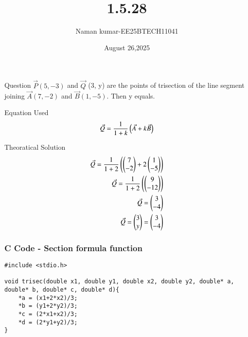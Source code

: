 \documentclass{beamer}
\begin{document}
\title 
{1.5.28}
\date{August 26,2025}

\author 
{Naman kumar-EE25BTECH11041}

\frame{\titlepage}
\begin{frame}{Question}
$\Vec{P} (5, -3)$ and $\Vec{Q}$ (3, y) are the points of trisection of the line segment joining $\Vec{A} (7, -2)$ and $\Vec{B} (1, -5)$. Then y equals.
\end{frame}

\begin{frame}{Equation Used}
\begin{align}
\Vec{Q}=\frac{1}{1+k}\left(\Vec{A}+k\Vec{B}\right)
\end{align}
\end{frame}

\begin{frame}{Theoratical Solution}
\begin{align}
\Vec{Q}=\frac{1}{1+2}\left(\begin{pmatrix}7\\-2\end{pmatrix}+2\begin{pmatrix}1\\-5\end{pmatrix}\right)\\
\Vec{Q}=\frac{1}{1+2}\left(\begin{pmatrix}9\\-12\end{pmatrix}\right)\\
\Vec{Q}=\begin{pmatrix}3\\-4\end{pmatrix}\\
\Vec{Q}=\begin{pmatrix}3\\y\end{pmatrix}=\begin{pmatrix}3\\-4\end{pmatrix}
\end{align}
\end{frame}

\begin{frame}[fragile]
\frametitle{C Code - Section formula function }
\begin{lstlisting}
#include <stdio.h>

void trisec(double x1, double y1, double x2, double y2, double* a, double* b, double* c, double* d){
    *a = (x1+2*x2)/3;
    *b = (y1+2*y2)/3;
    *c = (2*x1+x2)/3;
    *d = (2*y1+y2)/3;
}
\end{lstlisting}
    
\end{frame}
\end{document}
